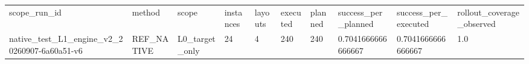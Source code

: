 \begin{tabular}{llllllllll}
scope\_run\_id & method & scope & instances & layouts & executed & planned & success\_per\_planned & success\_per\_executed & rollout\_coverage\_observed \\
native\_test\_L1\_engine\_v2\_20260907-6a60a51-v6 & REF\_NATIVE & L0\_target\_only & 24 & 4 & 240 & 240 & 0.7041666666666667 & 0.7041666666666667 & 1.0 \\
\end{tabular}
